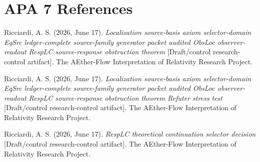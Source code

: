 \documentclass[11pt]{article}
\begin{document}
\section*{APA 7 References}

Ricciardi, A. S. (2026, June 17). \emph{Localization source-basis
axiom selector-domain EqSrc ledger-complete source-family generator
packet audited ObsLoc observer-readout RespLC source-response
obstruction theorem} [Draft/control research-control artifact]. The
AEther-Flow Interpretation of Relativity Research Project.

Ricciardi, A. S. (2026, June 17). \emph{Localization source-basis
axiom selector-domain EqSrc ledger-complete source-family generator
packet audited ObsLoc observer-readout RespLC source-response
obstruction theorem Refuter stress test} [Draft/control research-control
artifact]. The AEther-Flow Interpretation of Relativity Research
Project.

Ricciardi, A. S. (2026, June 17). \emph{RespLC theoretical
continuation selector decision} [Draft/control research-control
artifact]. The AEther-Flow Interpretation of Relativity Research
Project.
\end{document}
